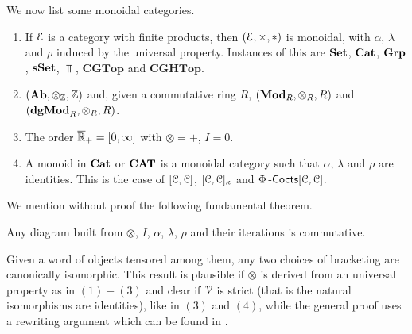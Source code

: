 \documentclass[a4paper,11pt,oneside,openany]{scrbook}
\begin{document}
\begin{exmp}
	We now list some monoidal categories.
	\begin{enumerate}
		\item If $\operatorname{\mathcal{E}}$ is a category with finite products, then $(\operatorname{\mathcal{E}},\times,*)$ is monoidal, with $\alpha$, $\lambda$ and $\rho$ induced by the universal property. Instances of this are ${\normalfont\textbf{Set}}$, ${\normalfont\textbf{Cat}}$, ${\normalfont\textbf{Grp}}$, ${\normalfont\textbf{sSet}}$, $\Top$, $\mathbf{CGTop}$ and $\mathbf{CGHTop}$.
		\item $({\normalfont\textbf{Ab}},\otimes_{\operatorname{\mathbb{Z}}},\operatorname{\mathbb{Z}})$ and, given a commutative ring $R$, $({\normalfont\textbf{Mod}}_R,\otimes_R,R)$ and $({\normalfont\textbf{dgMod}}_R,\otimes_R,R)$.
		\item The order $\overline{\operatorname{\mathbb{R}}}_+=[0,\infty]$ with $\otimes=+$, $I=0$.
		\item A monoid in ${\normalfont\textbf{Cat}}$ or ${\normalfont\textbf{CAT}}$ is a monoidal category such that
            $\alpha$, $\lambda$ and $\rho$ are identities. This is the case of
            $[\operatorname{\mathcal{C}},\operatorname{\mathcal{C}}]$, $[\operatorname{\mathcal{C}},\operatorname{\mathcal{C}}]_\kappa$ and $\Phi\operatorname{-\mathsf{Cocts}}[\operatorname{\mathcal{C}},\operatorname{\mathcal{C}}]$.
	\end{enumerate}
\end{exmp}

We mention without proof the following fundamental theorem.

\begin{thm}
	Any diagram built from $\otimes$, $I$, $\alpha$, $\lambda$, $\rho$ and their iterations is commutative.
\end{thm}

Given a word of objects tensored among them, any two choices of bracketing are
canonically isomorphic. This result is plausible if $\otimes$ is derived from an
universal property as in $(1)-(3)$ and clear if $\operatorname{\mathcal{V}}$ is strict (that is the
natural isomorphisms are identities), like in $(3)$ and $(4)$, while the general
proof uses a rewriting argument which can be found in \cite{MacLane2}.
\end{document}
